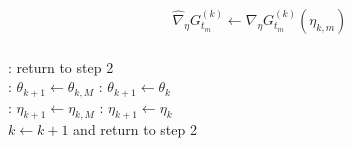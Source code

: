 \begin{algorithm}
\begin{algorithmic}[1]
\begin{gather}
            \widehat \nabla_\eta G_{t_m}^{(k)} \leftarrow \nabla_\eta G_{t_m}^{(k)}(\eta_{k,m})
        \end{gather}
    \EndIf
\EndFor
%
\\
%
:
    \State return to step 2 
\EndIf
%
\\
%
:
    \State $\theta_{k+1} \leftarrow \theta_{k,M}$
\Else:
    \State $\theta_{k+1} \leftarrow \theta_k$
\EndIf
%
\\
%
:
    \State $\eta_{k+1} \leftarrow \eta_{k,M}$
\Else:
    \State $\eta_{k+1} \leftarrow \eta_k$
\EndIf
%
\\
%
\State $k \leftarrow k+1$ and return to step 2
\end{algorithmic}
\end{algorithm}


